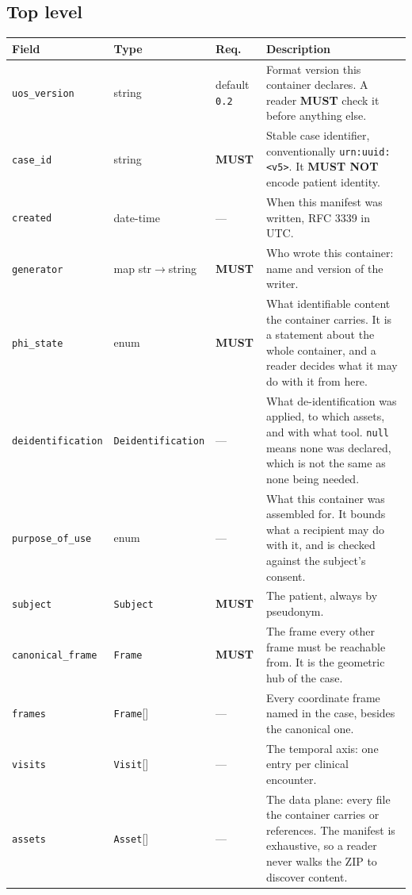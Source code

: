 \documentclass[11pt,a4paper]{article}
\newcommand{\MUST}{\textcolor{uosred}{\textbf{MUST}}}
\newcommand{\MUSTNOT}{\textcolor{uosred}{\textbf{MUST NOT}}}
\newcommand{\code}[1]{\texttt{\small #1}}
\begin{document}
\subsection{Top level}

\begin{longtable}{L{3.5cm} L{3.0cm} C{1.4cm} L{6.4cm}}
\toprule
\textbf{Field} & \textbf{Type} & \textbf{Req.} & \textbf{Description}\\
\midrule
\endhead
\code{uos\_version} & string & default \code{0.2} & Format version this container declares. A reader \MUST{} check it before anything else.\\
\code{case\_id} & string & \MUST{} & Stable case identifier, conventionally \code{urn:uuid:<v5>}. It \MUSTNOT{} encode patient identity.\\
\code{created} & date-time & --- & When this manifest was written, RFC 3339 in UTC.\\
\code{generator} & map str$\to$string & \MUST{} & Who wrote this container: name and version of the writer.\\
\code{phi\_state} & enum & \MUST{} & What identifiable content the container carries. It is a statement about the whole container, and a reader decides what it may do with it from here.\\
\code{deidentification} & \code{Deidentification} & --- & What de-identification was applied, to which assets, and with what tool. \code{null} means none was declared, which is not the same as none being needed.\\
\code{purpose\_of\_use} & enum & --- & What this container was assembled for. It bounds what a recipient may do with it, and is checked against the subject's consent.\\
\code{subject} & \code{Subject} & \MUST{} & The patient, always by pseudonym.\\
\code{canonical\_frame} & \code{Frame} & \MUST{} & The frame every other frame must be reachable from. It is the geometric hub of the case.\\
\code{frames} & \code{Frame}[] & --- & Every coordinate frame named in the case, besides the canonical one.\\
\code{visits} & \code{Visit}[] & --- & The temporal axis: one entry per clinical encounter.\\
\code{assets} & \code{Asset}[] & --- & The data plane: every file the container carries or references. The manifest is exhaustive, so a reader never walks the ZIP to discover content.\\

\end{longtable}
\end{document}
